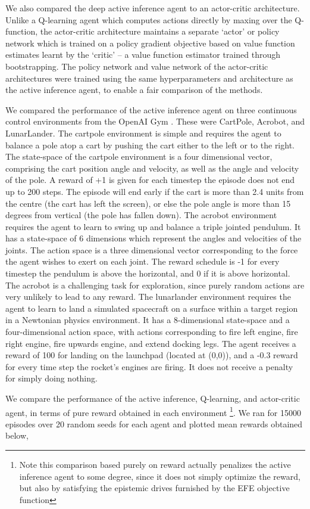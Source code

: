 We also compared the deep active inference agent to an actor-critic architecture. Unlike a Q-learning agent which computes actions directly by maxing over the Q-function, the actor-critic architecture maintains a separate `actor' or policy network which is trained on a policy gradient objective based on value function estimates learnt by the `critic' -- a value function estimator trained through bootstrapping. The policy network and value network of the actor-critic architectures were trained using the same hyperparameters and architecture as the active inference agent, to enable a fair comparison of the methods.

We compared the performance of the active inference agent on three continuous control environments from the OpenAI Gym \citep{brockman2016openai}. These were CartPole, Acrobot, and LunarLander. The cartpole environment is simple and requires the agent to balance a pole atop a cart by pushing the cart either to the left or to the right. The state-space of the cartpole environment is a four dimensional vector, comprising the cart position angle and velocity, as well as the angle and velocity of the pole. A reward of +1 is given for each timestep the episode does not end up to 200 steps. The episode will end early if the cart is more than 2.4 units from the centre (the cart has left the screen), or else the pole angle is more than 15 degrees from vertical (the pole has fallen down). The acrobot environment requires the agent to learn to swing up and balance a triple jointed pendulum. It has a state-space of 6 dimensions which represent the angles and velocities of the joints. The action space is a three dimensional vector corresponding to the force the agent wishes to exert on each joint. The reward schedule is -1 for every timestep the pendulum is above the horizontal, and 0 if it is above horizontal. The acrobot is a challenging task for exploration, since purely random actions are very unlikely to lead to any reward.  The lunarlander environment requires the agent to learn to land a simulated spacecraft on a surface within a target region in a Newtonian physics environment. It has a 8-dimensional state-space and a four-dimensional action space, with actions corresponding to fire left engine, fire right engine, fire upwards engine, and extend docking legs. The agent receives a reward of 100 for landing on the launchpad (located at (0,0)), and a -0.3 reward for every time step the rocket's engines are firing. It does not receive a penalty for simply doing nothing.

We compare the performance of the active inference, Q-learning, and actor-critic agent, in terms of pure reward obtained in each environment \footnote{Note this comparison based purely on reward actually penalizes the active inference agent to some degree, since it does not simply optimize the reward, but also by satisfying the epistemic drives furnished by the EFE objective function}. We ran for 15000 episodes over 20 random seeds for each agent and plotted mean rewards obtained below,

